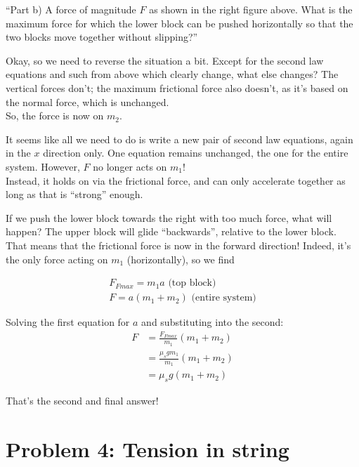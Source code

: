\documentclass[8.01x]{subfiles}
\begin{document}
``Part b) A force of magnitude $F$ as shown in the right figure above. What is the maximum force for which the lower block can be pushed horizontally so that the two blocks move together without slipping?''

Okay, so we need to reverse the situation a bit. Except for the second law equations and such from above which clearly change, what else changes? The vertical forces don't; the maximum frictional force also doesn't, as it's based on the normal force, which is unchanged.\\
So, the force is now on $m_2$.

It seems like all we need to do is write a new pair of second law equations, again in the $x$ direction only. One equation remains unchanged, the one for the entire system. However, $F$ no longer acts on $m_1$!\\
Instead, it holds on via the frictional force, and can only accelerate together as long as that is ``strong'' enough.

If we push the lower block towards the right with too much force, what will happen? The upper block will glide ``backwards'', relative to the lower block. That means that the frictional force is now in the forward direction! Indeed, it's the only force acting on $m_1$ (horizontally), so we find

\begin{align}
F_{Fmax} = m_1 a \text{ (top block)}\\
F = a(m_1 + m_2) \text{ (entire system)}
\end{align}

Solving the first equation for $a$ and substituting into the second:
\begin{align}
F &= \frac{F_{Fmax}}{m_1}(m_1 + m_2)\\
  &= \frac{\mu_s g m_1}{m_1}(m_1 + m_2)\\
  &= \mu_s g(m_1 + m_2)
\end{align}

That's the second and final answer!

\section{Problem 4: Tension in string}
\end{document}

